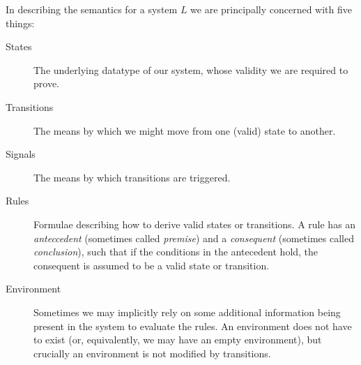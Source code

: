 \documentclass[11pt,a4paper]{article}
\theoremstyle{definition}
\theoremstyle{remark}
\begin{document}
In describing the semantics for a system $L$ we are principally concerned with
five things:

\begin{description}
\item [States] The underlying datatype of our system, whose validity we are
  required to prove.
\item [Transitions] The means by which we might move from one (valid) state to
  another.
\item [Signals] The means by which transitions are triggered.
\item [Rules] Formulae describing how to derive valid states or transitions. A
  rule has an \textit{anteccedent} (sometimes called \textit{premise}) and a
  \textit{consequent} (sometimes called \textit{conclusion}), such that if the
  conditions in the antecedent hold, the consequent is assumed to be a valid
  state or transition.
\item [Environment] Sometimes we may implicitly rely on some additional
  information being present in the system to evaluate the rules. An environment
  does not have to exist (or, equivalently, we may have an empty environment),
  but crucially an environment is not modified by transitions.
\end{description}
\end{document}
